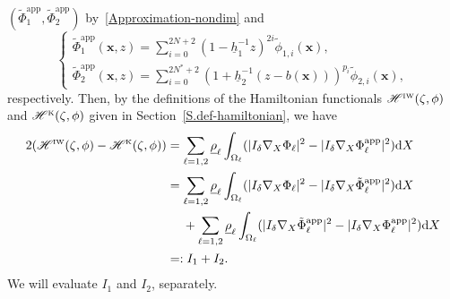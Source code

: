 \documentclass[11pt,leqno]{article}
\numberwithin{equation}{section}
\numberwithin{figure}{section}
\begin{document}
$(\tilde{\Phi}_1^\mathrm{app},\tilde{\Phi}_2^\mathrm{app})$ by~\eqref{Approximation-nondim} and 
%
\[
\begin{cases}
 \displaystyle
  \tilde{\Phi}_1^\mathrm{app}(\bm{x},z) = \sum_{i=0}^{2N+2} (1-\underline{h}_1^{-1}z)^{2i}\tilde{\phi}_{1,i}(\bm{x}), \\[2.5ex]
 \displaystyle
  \tilde{\Phi}_2^\mathrm{app}(\bm{x},z) = \sum_{i=0}^{2N^*+2} (1+\underline{h}_2^{-1}(z-b(\bm{x})))^{p_i}\tilde{\phi}_{2,i}(\bm{x}),
\end{cases}
\]
%
respectively. 
Then, by the definitions of the Hamiltonian functionals $\mathscr{H}^{\mbox{\rm\tiny IW}}(\zeta,\phi)$ and 
$\mathscr{H}^{\mbox{\rm\tiny K}}(\zeta,\phi)$ given in Section~\ref{S.def-hamiltonian}, we have 
%
\begin{align*}
2(\mathscr{H}^{\mbox{\rm\tiny IW}}(\zeta,\phi)-\mathscr{H}^{\mbox{\rm\tiny K}}(\zeta,\phi))
&= \sum_{\ell=1,2}\underline{\rho}_\ell\int_{\Omega_\ell}
 (|I_\delta\nabla_X\Phi_\ell|^2 - |I_\delta\nabla_X\Phi_\ell^\mathrm{app}|^2)\mathrm{d}X \\
&= \sum_{\ell=1,2}\underline{\rho}_\ell\int_{\Omega_\ell}
 (|I_\delta\nabla_X\Phi_\ell|^2 - |I_\delta\nabla_X\tilde{\Phi}_\ell^\mathrm{app}|^2)\mathrm{d}X \\
&\quad\;
 + \sum_{\ell=1,2}\underline{\rho}_\ell\int_{\Omega_\ell}
 (|I_\delta\nabla_X\tilde{\Phi}_\ell^\mathrm{app}|^2 - |I_\delta\nabla_X\Phi_\ell^\mathrm{app}|^2)\mathrm{d}X \\
&=: I_1+I_2.
\end{align*}
%
We will evaluate $I_1$ and $I_2$, separately. 
\end{document}
